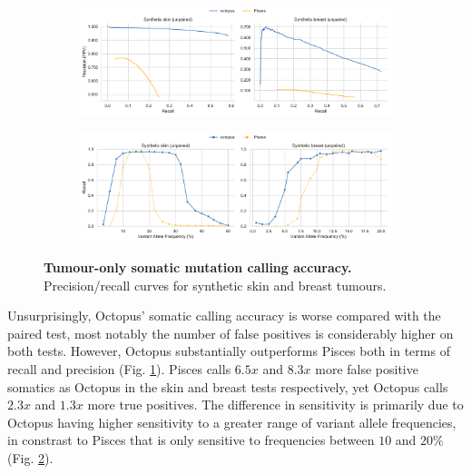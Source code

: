 \documentclass[notitlepage, twocolumn]{article}
\begin{document}
\begin{figure}[ht!]
    \centering
\captionsetup[subfigure]{position=top,labelfont=bf,textfont=normalfont,singlelinecheck=off,justification=raggedright}
    \begin{subfigure}[b]{\linewidth}
        \vspace{-0.5cm}
        \caption{}
        \includegraphics[width=\linewidth]{figures/tumour-only-precision-recalls}
        \label{fig:to-somatic_pr}
    \end{subfigure}
    \begin{subfigure}[b]{\linewidth}
        \vspace{-0.5cm}
        \caption{}
        \includegraphics[width=\linewidth]{figures/tumour-only-vaf-recalls}
        \label{fig:to-somatic_vaf_recall}
    \end{subfigure}
    \vspace{-1.cm}
    \caption{\textbf{Tumour-only somatic mutation calling accuracy.} \protect{} Precision/recall curves for synthetic skin and breast tumours. \protect{} }
    \label{fig:syntumour-tumour-only}
\end{figure}

Unsurprisingly, Octopus' somatic calling accuracy is worse compared with the paired test, most notably the number of false positives is considerably higher on both tests. However, Octopus substantially outperforms Pisces both in terms of recall and precision (Fig. \ref{fig:to-somatic_pr}). Pisces calls $6.5x$ and $8.3x$ more false positive somatics as Octopus in the skin and breast tests respectively, yet Octopus calls $2.3x$ and $1.3x$ more true positives. The difference in sensitivity is primarily due to Octopus having higher sensitivity to a greater range of variant allele frequencies, in constrast to Pisces that is only sensitive to frequencies between $10$ and $20\%$ (Fig. \ref{fig:to-somatic_vaf_recall}).
\end{document}
